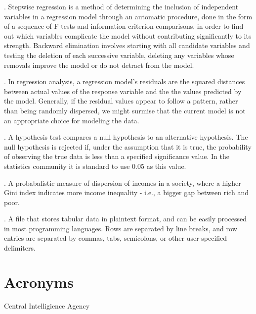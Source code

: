 \documentclass[oneside,12pt]{report}
\begin{document}
\vspace{8pt} . Stepwise regression is a method of determining the inclusion of independent variables in a regression model through an automatic procedure, done in the form of a sequence of F-tests and information criterion comparisons, in order to find out which variables complicate the model without contributing significantly to its strength. Backward elimination involves starting with all candidate variables and testing the deletion of each successive variable, deleting any variables whose removals improve the model or do not detract from the model.

\vspace{8pt} . In regression analysis, a regression model's residuals are the squared distances between actual values of the response variable and the the values predicted by the model. Generally, if the residual values appear to follow a pattern, rather than being randomly dispersed, we might surmise that the current model is not an appropriate choice for modeling the data.

\vspace{8pt} . A hypothesis test compares a null hypothesis to an alternative hypothesis. The null hypothesis is rejected if, under the assumption that it is true, the probability of observing the true data is less than a specified significance value. In the statistics community it is standard to use 0.05 as this value.

\vspace{8pt} . A probabalistic measure of dispersion of incomes in a society, where a higher Gini index indicates more income inequality - i.e., a bigger gap between rich and poor.

\vspace{8pt} . A file that stores tabular data in plaintext format, and can be easily processed in most programming languages. Rows are separated by line breaks, and row entries are separated by commas, tabs, semicolons, or other user-specified delimiters.


\chapter{Acronyms}\label{Acronyms}

 Central Intelligience Agency
\vspace{5pt}
\end{document}
